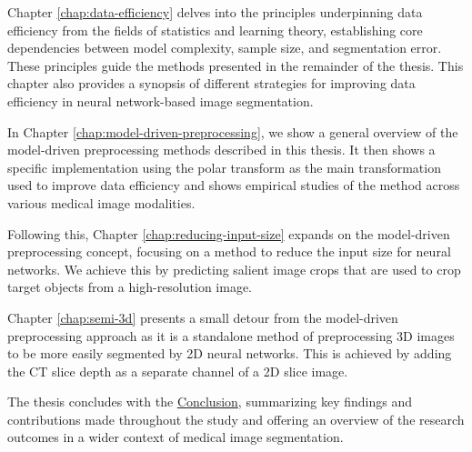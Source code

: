Chapter \ref{chap:data-efficiency} delves into the principles underpinning data efficiency from the fields of statistics and learning theory, establishing core dependencies between model complexity, sample size, and segmentation error. These principles guide the methods presented in the remainder of the thesis. This chapter also provides a synopsis of different strategies for improving data efficiency in neural network-based image segmentation.

In Chapter \ref{chap:model-driven-preprocessing}, we show a general overview of the model-driven preprocessing methods described in this thesis. It then shows a specific implementation using the polar transform as the main transformation used to improve data efficiency and shows empirical studies of the method across various medical image modalities.

Following this, Chapter \ref{chap:reducing-input-size} expands on the model-driven preprocessing concept, focusing on a method to reduce the input size for neural networks. We achieve this by predicting salient image crops that are used to crop target objects from a high-resolution image.

Chapter \ref{chap:semi-3d} presents a small detour from the model-driven preprocessing approach as it is a standalone method of preprocessing 3D images to be more easily segmented by 2D neural networks. This is achieved by adding the CT slice depth as a separate channel of a 2D slice image.

The thesis concludes with the \hyperref[chap:conclusion]{Conclusion}, summarizing key findings and contributions made throughout the study and offering an overview of the research outcomes in a wider context of medical image segmentation.
